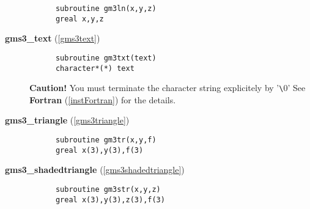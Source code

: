 \begin{description}
\begin{verbatim}
      subroutine gm3ln(x,y,z)
      greal x,y,z
\end{verbatim}


\item[
{\bf gms3\_text} (\ref{gms3text})]\mbox{}


\begin{verbatim}
      subroutine gm3txt(text)
      character*(*) text
\end{verbatim}

{\bf Caution!} You must terminate the character string explicitely 
by '\verb+\+0'
See 
{\bf Fortran} (\ref{instFortran}) for the  details.


\item[
{\bf gms3\_triangle} (\ref{gms3triangle})]\mbox{}


\begin{verbatim}
      subroutine gm3tr(x,y,f)
      greal x(3),y(3),f(3)
\end{verbatim}


\item[
{\bf gms3\_shadedtriangle} (\ref{gms3shadedtriangle})]\mbox{}


\begin{verbatim}
      subroutine gm3str(x,y,z)
      greal x(3),y(3),z(3),f(3)
\end{verbatim}

\end{description}
                   


